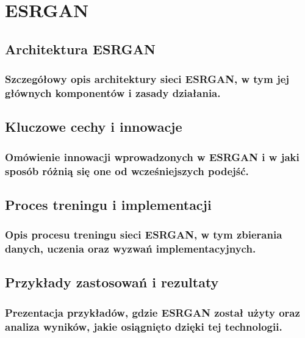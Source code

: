 \chapter{ESRGAN}
\section{Architektura ESRGAN}
\subsection{Szczegółowy opis architektury sieci ESRGAN, w tym jej głównych komponentów i zasady działania.}
\section{Kluczowe cechy i innowacje}
\subsection{Omówienie innowacji wprowadzonych w ESRGAN i w jaki sposób różnią się one od wcześniejszych podejść.}
\section{Proces treningu i implementacji}
\subsection{Opis procesu treningu sieci ESRGAN, w tym zbierania danych, uczenia oraz wyzwań implementacyjnych.}
\section{Przykłady zastosowań i rezultaty}
\subsection{Prezentacja przykładów, gdzie ESRGAN został użyty oraz analiza wyników, jakie osiągnięto dzięki tej technologii.}